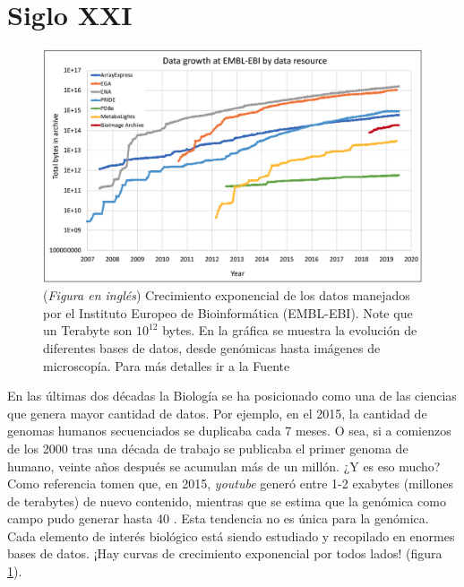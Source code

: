 \section{Siglo XXI}

\begin{figure}[tb]
  \centering
  \includegraphics[width=0.9\columnwidth]{images/Dat_trend.png}
  \caption{
      (\textit{Figura en inglés})
      Crecimiento exponencial de los datos manejados por el Instituto Europeo de Bioinformática (EMBL-EBI).
      Note que un Terabyte son $10^{12}$ bytes.
      En la gráfica se muestra la evolución de diferentes bases de datos, desde genómicas hasta imágenes de microscopía.
      Para más detalles ir a la Fuente \cite{cookEuropeanBioinformaticsInstitute2020}
  }
  \label{fig:Dat_trend}
\end{figure}

En las últimas dos décadas la Biología se ha posicionado como una de las ciencias que genera mayor cantidad de datos.
Por ejemplo, en el 2015, la cantidad de genomas humanos secuenciados se duplicaba cada 7 meses.
O sea, si a comienzos de los 2000 tras una década de trabajo se publicaba el primer genoma de humano, veinte años después se acumulan más de un millón.
¿Y es eso mucho?
Como referencia tomen que, en 2015, \textit{youtube} generó entre 1-2 exabytes (millones de terabytes) de nuevo contenido, mientras que se estima que la genómica como campo pudo generar hasta 40 \cite{stephensBigDataAstronomical2015}.
Esta tendencia no es única para la genómica.
Cada elemento de interés biológico está siendo estudiado y recopilado en enormes bases de datos.
¡Hay curvas de crecimiento exponencial por todos lados! (figura \ref{fig:Dat_trend}).

